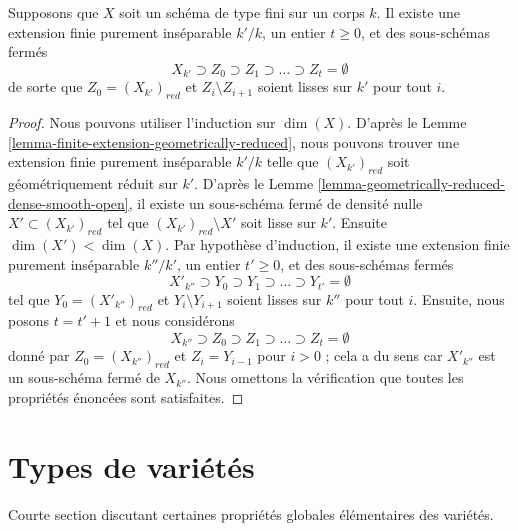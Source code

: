 \begin{lemma}
\label{lemma-smooth-stratification}
Supposons que $X$ soit un schéma de type fini sur un
corps $k$. Il existe une extension finie purement
inséparable $k'/k$, un entier $t \geq 0$, et des sous-schémas fermés
$$
X_{k'} \supset Z_0 \supset Z_1 \supset \ldots \supset Z_t = \emptyset
$$
de sorte que $Z_0 = (X_{k'})_{red}$ et $Z_i
\setminus Z_{i + 1}$ soient lisses sur $k'$ pour tout $i$.
\end{lemma}

\begin{proof}
Nous pouvons utiliser l'induction sur $\dim(X)$. D'après le
Lemme \ref{lemma-finite-extension-geometrically-reduced}, nous
pouvons trouver une extension finie purement inséparable
$k'/k$ telle que $(X_{k'})_{red}$ soit géométriquement réduit
sur $k'$. D'après le Lemme
\ref{lemma-geometrically-reduced-dense-smooth-open}, il existe un
sous-schéma fermé de densité nulle $X' \subset (X_{k'})_{red}$ tel que
$(X_{k'})_{red} \setminus X'$ soit lisse sur $k'$. Ensuite $\dim(X') <
\dim(X)$. Par hypothèse d'induction, il existe une extension finie
purement inséparable $k''/k'$, un entier $t' \geq 0$, et des sous-schémas fermés
$$
X'_{k''} \supset Y_0 \supset Y_1 \supset \ldots \supset Y_{t'} = \emptyset
$$
tel que $Y_0 = (X'_{k''})_{red}$ et $Y_i \setminus
Y_{i + 1}$ soient lisses sur $k''$ pour tout $i$.
Ensuite, nous posons $t = t' + 1$ et nous considérons
$$
X_{k''} \supset Z_0 \supset Z_1 \supset \ldots \supset Z_t = \emptyset
$$
donné par $Z_0 = (X_{k''})_{red}$ et $Z_i = Y_{i - 1}$ pour $i > 0$ ; cela
a du sens car $X'_{k''}$ est un sous-schéma fermé de $X_{k''}$. Nous
omettons la vérification que toutes les propriétés énoncées sont satisfaites.
\end{proof}




\section{Types de variétés}
\label{section-types}

\noindent
Courte section discutant certaines propriétés globales élémentaires des variétés.

